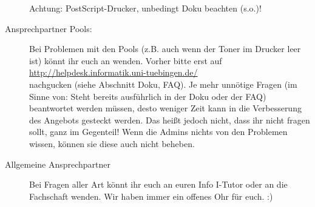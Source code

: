 \begin{description}
     Achtung: PostScript-Drucker, unbedingt Doku beachten (s.o.)!

  \item[Ansprechpartner Pools:]
    Bei Problemen mit den Pools (z.B. auch wenn der Toner im Drucker
    leer ist) könnt ihr euch an 
    wenden.  Vorher bitte erst auf \\\url{http://helpdesk.informatik.uni-tuebingen.de/}\\ nachgucken
    (siehe Abschnitt Doku, FAQ).  Je mehr unnötige Fragen (im Sinne von:
    Steht bereits ausführlich in der Doku oder der FAQ) beantwortet werden müssen,
    desto weniger Zeit kann in die Verbesserung des Angebots gesteckt
    werden.  Das heißt jedoch nicht, dass ihr nicht fragen sollt, ganz im
    Gegenteil!  Wenn die Admins nichts von den Problemen wissen, können sie
    diese auch nicht beheben.

  \item[Allgemeine Ansprechpartner]
    Bei Fragen aller Art könnt ihr euch an euren Info I-Tutor oder an die
    Fachschaft wenden.  Wir haben immer ein offenes Ohr für euch. :)


\end{description}
